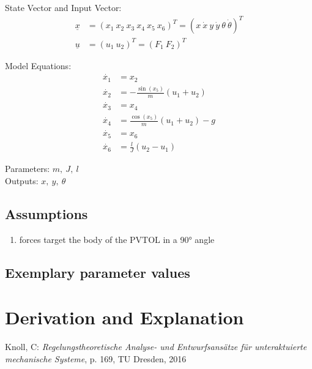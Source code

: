 \documentclass[10pt,a4paper]{article}
\begin{document}
	State Vector and Input Vector:
	\begin{align*}
		\underline{x} &= (x_1 \ x_2 \ x_3 \ x_4 \ x_5 \ x_6)^T = (x \ \dot{x} \ y \ \dot{y} \ \theta \ \dot{\theta})^T \\
		\underline{u} &= (u_1 \ u_2)^T = (F_1 \ F_2)^T
	\end{align*}

	\noindent Model Equations:	
	\begin{subequations}
	\begin{align}
		\dot{x_1} &= x_2 	\\ 
		\dot{x_2} &= -\frac{\sin(x_5)}{m} (u_1 + u_2)  \\
		\dot{x_3} &= x_4 \\
		\dot{x_4} &= \frac{\cos(x_5)}{m} (u_1 + u_2) - g \\
		\dot{x_5} &= x_6 \\
		\dot{x_6} &= \frac{l}{J} (u_2 - u_1)
	\end{align}
	\end{subequations}

	\noindent
	Parameters: $m, ~J, ~l$ %
	\\
	Outputs:  $x, ~y, ~\theta$%
	
	
	\subsection{Assumptions} %
		\begin{enumerate} %
			\item forces target the body of the PVTOL in a 90° angle
		\end{enumerate}
	
	
	\subsection{Exemplary parameter values}
	

	
	\section{Derivation and Explanation} %
	
	
	\begin{thebibliography}{10}		
		Knoll, C: 
		\textit{Regelungstheoretische Analyse- und Entwurfsansätze für unteraktuierte mechanische Systeme}, p. 169, TU Dresden, 2016
	\end{thebibliography}
\end{document}
